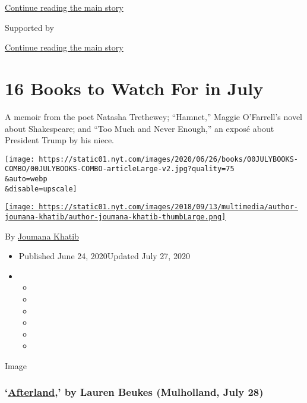 \protect\hyperlink{after-top}{Continue reading the main story}

Supported by

\protect\hyperlink{after-sponsor}{Continue reading the main story}

\hypertarget{16-books-to-watch-for-in-july}{%
\section{16 Books to Watch For in
July}\label{16-books-to-watch-for-in-july}}

A memoir from the poet Natasha Trethewey; ``Hamnet,'' Maggie O'Farrell's
novel about Shakespeare; and ``Too Much and Never Enough,'' an exposé
about President Trump by his niece.

\texttt{[image: https://static01.nyt.com/images/2020/06/26/books/00JULYBOOKS-COMBO/00JULYBOOKS-COMBO-articleLarge-v2.jpg?quality=75\\\&auto=webp\\\&disable=upscale]}

\href{https://nytimes.com/by/joumana-khatib}{\texttt{[image: https://static01.nyt.com/images/2018/09/13/multimedia/author-joumana-khatib/author-joumana-khatib-thumbLarge.png]}}

By \href{https://nytimes.com/by/joumana-khatib}{Joumana Khatib}

\begin{itemize}
\item
  Published June 24, 2020Updated July 27, 2020
\item
  \begin{itemize}
  \item
  \item
  \item
  \item
  \item
  \item
  \end{itemize}
\end{itemize}

Image

\hypertarget{afterland-by-lauren-beukes-mulholland-july-28}{%
\subsubsection{\texorpdfstring{`\href{https://www.mulhollandbooks.com/titles/lauren-beukes/afterland/9780316267847/}{Afterland},'
by Lauren Beukes (Mulholland, July
28)}{`Afterland,' by Lauren Beukes (Mulholland, July 28)}}\label{afterland-by-lauren-beukes-mulholland-july-28}}

